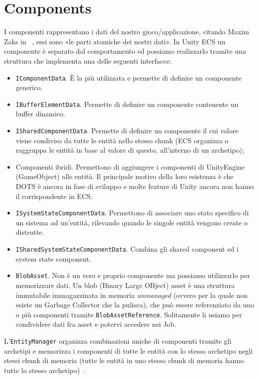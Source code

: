 \section{Components}
I componenti rappresentano i dati del nostro gioco/applicazione, citando Maxim Zaks in ~\cite{article:components-definition}, essi sono «le parti atomiche dei nostri dati». In Unity ECS un componente è separato dal comportamento ed possiamo realizzarlo tramite una struttura che implementa una delle seguenti interfacce:
\begin{itemize}
    \item \verb|IComponentData|. È la più utilizzata e permette di definire un componente generico.
    \item \verb|IBufferElementData|. Permette di definire un componente contenente un buffer dinamico.
    \item \verb|ISharedComponentData|. Permette di definire un componente il cui valore viene condiviso da tutte le entità nello stesso chunk (ECS organizza o raggruppa le entità in base al valore di questo, all'interno di un archetipo);
    \item Componenti ibridi. Permettono di aggiungere i componenti di UnityEngine (GameObject) alle entità. Il principale motivo della loro esistenza è che DOTS è ancora in fase di sviluppo e molte feature di Unity ancora non hanno il corrispondente in ECS.
    \item \verb|ISystemStateComponentData|. Permettono di associare uno stato specifico di un sistema ad un'entità, rilevando quando le singole entità vengono create o distrutte.
    \item \verb|ISharedSystemStateComponentData|. Combina gli shared component ed i system state component.
    \item \verb|BlobAsset|. Non è un vero e proprio componente ma possiamo utilizzarlo per memorizzare dati. Un blob (Binary Large OBject) asset è una struttura immutabile immagazzinata in memoria \emph{unmanaged} (ovvero per la quale non esiste un Garbage Collector che la pulisca), che può essere referenziato da uno o più componenti tramite \verb|BlobAssetReference|. Solitamente li usiamo per condividere dati fra asset e potervi accedere nei \Csh{} Job.
\end{itemize}

L'\verb|EntityManager| organizza combinazioni uniche di componenti tramite gli archetipi e memorizza i componenti di tutte le entità con lo stesso archetipo negli stessi chunk di memoria (tutte le entità in uno stesso chunk di memoria hanno tutte lo stesso archetipo)~\cite{doc:unity-entities-manual}.

